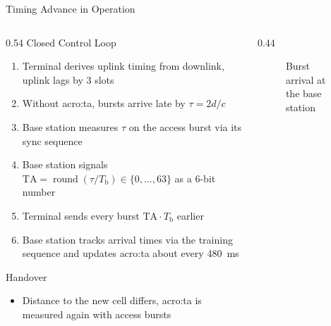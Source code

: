 \begin{frame}{Timing Advance in Operation}
  \begin{columns}[T,onlytextwidth]
    \begin{column}{0.54\textwidth}
      Closed Control Loop~\cite{etsi.145.001.v18}
      \begin{enumerate}
        \item Terminal derives uplink timing from downlink, uplink lags by 3 slots
        \item Without \gls{acro:ta}, bursts arrive late by $\tau = 2d/c$
        \item Base station measures $\tau$ on the access burst via its sync sequence
        \item Base station signals $\mathrm{TA} = \operatorname{round}(\tau/T_\mathrm{b}) \in \{0, \dots, 63\}$ as a 6-bit number
        \item Terminal sends every burst $\mathrm{TA}\cdot T_\mathrm{b}$ earlier
        \item Base station tracks arrival times via the training sequence and updates \gls{acro:ta} about every \qty{480}{\milli\second}
      \end{enumerate}
      Handover
      \begin{itemize}
        \item Distance to the new cell differs, \gls{acro:ta} is measured again with access bursts
      \end{itemize}
    \end{column}
    \begin{column}{0.44\textwidth}
      \begin{figure}
        \centering
        
        \caption{Burst arrival at the base station}
      \end{figure}
    \end{column}
  \end{columns}
\end{frame}

